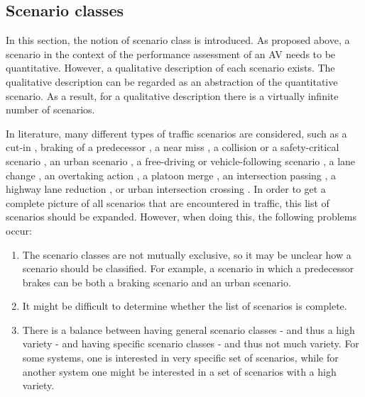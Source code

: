 \subsection{Scenario classes}
\label{sec:scenario classes}
In this section, the notion of scenario class is introduced. As proposed above, a scenario in the context of the performance assessment of an AV needs to be quantitative. However, a qualitative description of each scenario exists. The qualitative description can be regarded as an abstraction of the quantitative scenario. As a result, for a qualitative description there is a virtually infinite number of scenarios.

In literature, many different types of traffic scenarios are considered, such as a cut-in \cite{xu2002effects, gietelink2006development,roesener2017comprehensive}, braking of a predecessor \cite{xu2002effects,deGelder2017assessment,hulshof2013autonomous}, a near miss \cite{gietelink2006development}, a collision or a safety-critical scenario \cite{gietelink2006development,ebner2011identifying}, an urban scenario \cite{zofka2015datadrivetrafficscenarios}, a free-driving or vehicle-following scenario \cite{roesener2017comprehensive}, a lane change \cite{roesener2017comprehensive}, an overtaking action \cite{karaduman2013interactivebehavior}, a platoon merge \cite{englund2016grand}, an intersection passing \cite{englund2016grand}, a highway lane reduction \cite{ploeg2017GCDC}, or urban intersection crossing \cite{ploeg2017GCDC}. In order to get a complete picture of all scenarios that are encountered in traffic, this list of scenarios should be expanded. However, when doing this, the following problems occur:

\begin{enumerate}
	\item The scenario classes are not mutually exclusive, so it may be unclear how a scenario should be classified. For example, a scenario in which a predecessor brakes can be both a braking scenario and an urban scenario.
	\item It might be difficult to determine whether the list of scenarios is complete.
	\item There is a balance between having general scenario classes - and thus a high variety - and having specific scenario classes - and thus not much variety. For some systems, one is interested in very specific set of scenarios, while for another system one might be interested in a set of scenarios with a high variety.
\end{enumerate}

